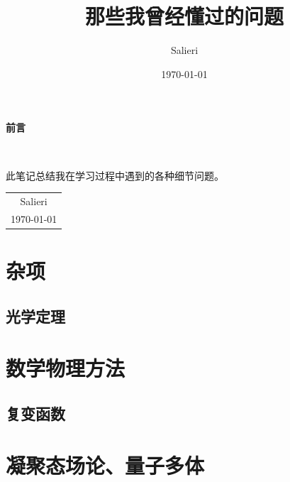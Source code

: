 \documentclass[10pt, a4paper, oneside]{ctexbook}
\title{{\Huge{\textbf{那些我曾经懂过的问题}}}\\}
\author{Salieri}
\date{\today}
\begin{document}
	\maketitle
	
	\setcounter{page}{1}
	
	\begin{center}
		\Huge\textbf{前言}
	\end{center}~\
	
	此笔记总结我在学习过程中遇到的各种细节问题。
	~\\
	\begin{flushright}
		\begin{tabular}{c}
			Salieri\\
			\today
		\end{tabular}
	\end{flushright}
	
	\newpage
	\setcounter{page}{1}
	\tableofcontents
	\newpage
	\setcounter{page}{1}
	\chapter{杂项}
	\section{光学定理}
	\chapter{数学物理方法}
	\section{复变函数}
	\chapter{凝聚态场论、量子多体}
\end{document}
